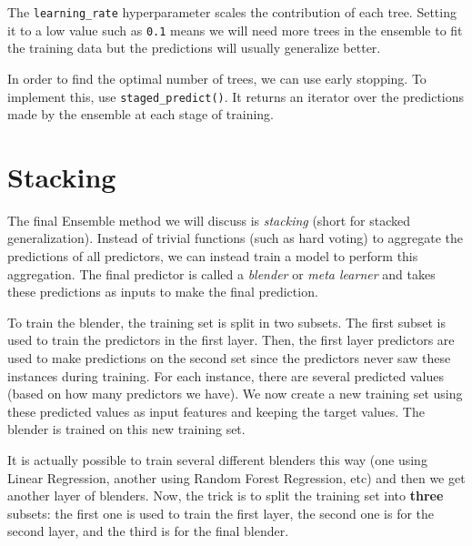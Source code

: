 \documentclass[letterpaper]{article}
\begin{document}
The \texttt{learning\_rate} hyperparameter scales the contribution of each tree. Setting it to a low value such as \texttt{0.1} means we will need more trees in the ensemble to fit the training data but the predictions will usually generalize better. 

In order to find the optimal number of trees, we can use early stopping. To implement this, use \texttt{staged\_predict()}. It returns an iterator over the predictions made by the ensemble at each stage of training. 

\section{Stacking}
The final Ensemble method we will discuss is \textsl{stacking} (short for stacked generalization). Instead of trivial functions (such as hard voting) to aggregate the predictions of all predictors, we can instead train a model to perform this aggregation. The final predictor is called a \textsl{blender} or \textsl{meta learner} and takes these predictions as inputs to make the final prediction. 

To train the blender, the training set is split in two subsets. The first subset is used to train the predictors in the first layer. Then, the first layer predictors are used to make predictions on the second set since the predictors never saw these instances during training. For each instance, there are several predicted values (based on how many predictors we have). We now create a new training set using these predicted values as input features and keeping the target values. The blender is trained on this new training set. 

It is actually possible to train several different blenders this way (one using Linear Regression, another using Random Forest Regression, etc) and then we get another layer of blenders. Now, the trick is to split the training set into \textbf{three} subsets: the first one is used to train the first layer, the second one is for the second layer, and the third is for the final blender. 
\end{document}
